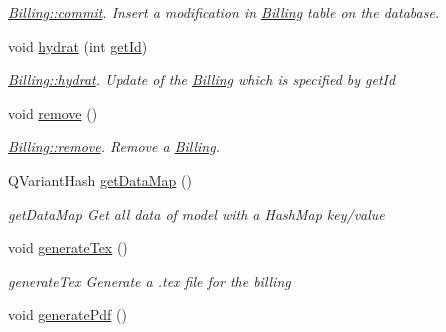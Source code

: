 \begin{DoxyCompactItemize}
\begin{DoxyCompactList}\small\item\em \hyperlink{classModels_1_1Billing_ad2280a0d8dde4c36e88c344b01044caf}{Billing\-::commit}. Insert a modification in \hyperlink{classModels_1_1Billing}{Billing} table on the database. \end{DoxyCompactList}\item 
void \hyperlink{classModels_1_1Billing_a689643008955fdcd5833631a6202c0dc}{hydrat} (int \hyperlink{classModels_1_1IModel_a63087bb34da8c38a11109cd775122d31}{get\-Id})
\begin{DoxyCompactList}\small\item\em \hyperlink{classModels_1_1Billing_a689643008955fdcd5833631a6202c0dc}{Billing\-::hydrat}. Update of the \hyperlink{classModels_1_1Billing}{Billing} which is specified by {\itshape get\-Id} \end{DoxyCompactList}\item 
\hypertarget{classModels_1_1Billing_ada8a7c127a80fa7349fbd6a7d30ca4a3}{void \hyperlink{classModels_1_1Billing_ada8a7c127a80fa7349fbd6a7d30ca4a3}{remove} ()}\label{classModels_1_1Billing_ada8a7c127a80fa7349fbd6a7d30ca4a3}

\begin{DoxyCompactList}\small\item\em \hyperlink{classModels_1_1Billing_ada8a7c127a80fa7349fbd6a7d30ca4a3}{Billing\-::remove}. Remove a \hyperlink{classModels_1_1Billing}{Billing}. \end{DoxyCompactList}\item 
Q\-Variant\-Hash \hyperlink{classModels_1_1Billing_a2363c0b978434c0a835f894a67eb81e1}{get\-Data\-Map} ()
\begin{DoxyCompactList}\small\item\em get\-Data\-Map Get all data of model with a Hash\-Map key/value \end{DoxyCompactList}\item 
\hypertarget{classModels_1_1Billing_a3f835c6f4ea0b66c43bb7fec40c6e075}{void \hyperlink{classModels_1_1Billing_a3f835c6f4ea0b66c43bb7fec40c6e075}{generate\-Tex} ()}\label{classModels_1_1Billing_a3f835c6f4ea0b66c43bb7fec40c6e075}

\begin{DoxyCompactList}\small\item\em generate\-Tex Generate a .tex file for the billing \end{DoxyCompactList}\item 
\hypertarget{classModels_1_1Billing_a27e273242564cdb68c14810a4580f8e5}{void \hyperlink{classModels_1_1Billing_a27e273242564cdb68c14810a4580f8e5}{generate\-Pdf} ()}\label{classModels_1_1Billing_a27e273242564cdb68c14810a4580f8e5}


\end{DoxyCompactItemize}
